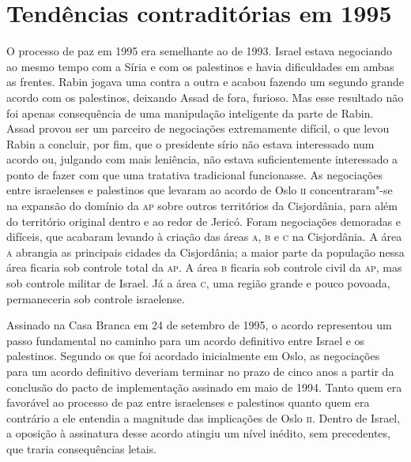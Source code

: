 \section{Tendências contraditórias em 1995}

O processo de paz em 1995 era semelhante ao de 1993. Israel estava
negociando ao mesmo tempo com a Síria e com os palestinos e havia
dificuldades em ambas as frentes. Rabin jogava uma contra a outra e
acabou fazendo um segundo grande acordo com os palestinos, deixando Assad
de fora, furioso. Mas esse resultado não foi apenas consequência de uma
manipulação inteligente da parte de Rabin. Assad provou ser um parceiro
de negociações extremamente difícil, o que levou Rabin a concluir, por
fim, que o presidente sírio não estava interessado num acordo ou,
julgando com mais leniência, não estava suficientemente interessado a
ponto de fazer com que uma tratativa tradicional funcionasse. As
negociações entre israelenses e palestinos que levaram ao acordo de Oslo
\textsc{ii} concentraram"-se na expansão do domínio da \textsc{ap} sobre outros territórios
da Cisjordânia, para além do território original dentro e ao redor de
Jericó. Foram negociações demoradas e difíceis, que acabaram levando à
criação das áreas \textsc{a}, \textsc{b} e \textsc{c}
na Cisjordânia. A área \textsc{a} abrangia as
principais cidades da Cisjordânia; a maior parte da população nessa área
ficaria sob controle total da \textsc{ap}. A área \textsc{b} ficaria sob controle civil da
\textsc{ap}, mas sob controle militar de Israel. Já a área \textsc{c}, uma região grande e
pouco povoada, permaneceria sob controle israelense.

Assinado na Casa Branca em 24 de setembro de 1995, o acordo representou
um passo fundamental no caminho para um acordo definitivo entre Israel e
os palestinos. Segundo os que foi acordado inicialmente em Oslo, as negociações para
um acordo definitivo deveriam terminar no prazo de cinco anos a partir
da conclusão do pacto de implementação assinado em maio de 1994. Tanto
quem era favorável ao processo de paz entre israelenses e palestinos
quanto quem era contrário a ele entendia a magnitude das implicações de
Oslo \textsc{ii}. Dentro de Israel, a oposição à assinatura desse acordo atingiu
um nível inédito, sem precedentes, que traria consequências letais.

